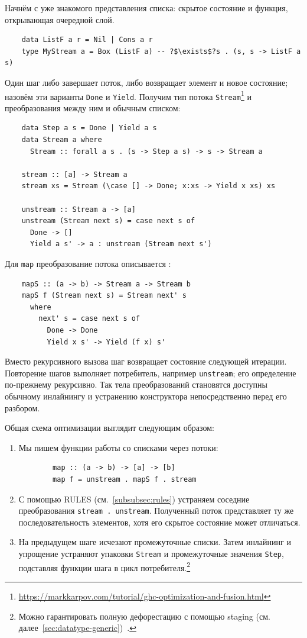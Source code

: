 Начнём с уже знакомого представления списка: скрытое состояние и функция, открывающая очередной слой.
\begin{verbatim}
    data ListF a r = Nil | Cons a r
    type MyStream a = Box (ListF a) -- ?$\exists$?s . (s, s -> ListF a s)
\end{verbatim}
Один шаг либо завершает поток, либо возвращает элемент и новое состояние; назовём эти варианты \texttt{Done} и \texttt{Yield}.
Получим тип потока \texttt{Stream}\footnote{\url{https://markkarpov.com/tutorial/ghc-optimization-and-fusion.html}} и преобразования между ним и обычным списком:
\begin{verbatim}
    data Step a s = Done | Yield a s
    data Stream a where
      Stream :: forall a s . (s -> Step a s) -> s -> Stream a

    stream :: [a] -> Stream a
    stream xs = Stream (\case [] -> Done; x:xs -> Yield x xs) xs

    unstream :: Stream a -> [a]
    unstream (Stream next s) = case next s of
      Done -> []
      Yield a s' -> a : unstream (Stream next s')
\end{verbatim}

Для \texttt{map} преобразование потока описывается :
\begin{verbatim}
    mapS :: (a -> b) -> Stream a -> Stream b
    mapS f (Stream next s) = Stream next' s
      where
        next' s = case next s of
          Done -> Done
          Yield x s' -> Yield (f x) s'
\end{verbatim}
Вместо рекурсивного вызова шаг возвращает состояние следующей итерации.
Повторение шагов выполняет потребитель, например \texttt{unstream}; его определение по-прежнему рекурсивно.
Так тела преобразований становятся доступны обычному инлайнингу и устранению конструктора непосредственно перед его разбором.

\begin{samepage}
Общая схема оптимизации выглядит следующим образом:
\begin{enumerate}
    \item Мы пишем функции работы со списками через потоки:
    \begin{verbatim}
        map :: (a -> b) -> [a] -> [b]
        map f = unstream . mapS f . stream
    \end{verbatim}
    \item С помощью RULES (см.~\ref{subsubsec:rules}) устраняем соседние преобразования \texttt{stream . unstream}. Полученный поток представляет ту же последовательность элементов, хотя его скрытое состояние может отличаться.
    \item На предыдущем шаге исчезают промежуточные списки. Затем инлайнинг и упрощение устраняют упаковки \texttt{Stream} и промежуточные значения \texttt{Step}, подставляя функции шага в цикл потребителя.\footnote{Можно гарантировать полную дефорестацию с помощью staging (см. далее~\ref{sec:datatype-generic})~\cite{kiselyov2017stream}.}
\end{enumerate}
\par\end{samepage}

